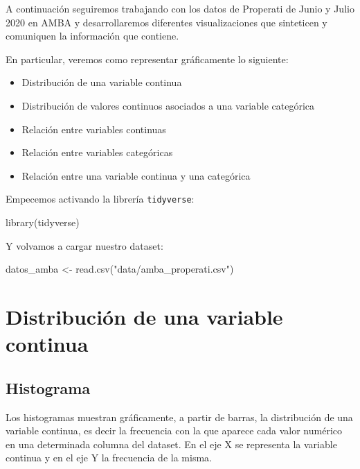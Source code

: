 \documentclass[
  spanish,
]{book}
\newenvironment{Shaded}{\begin{snugshade}}{\end{snugshade}}
\newcommand{\FunctionTok}[1]{\textcolor[rgb]{0.00,0.00,0.00}{#1}}
\newcommand{\NormalTok}[1]{#1}
\newcommand{\OtherTok}[1]{\textcolor[rgb]{0.56,0.35,0.01}{#1}}
\newcommand{\StringTok}[1]{\textcolor[rgb]{0.31,0.60,0.02}{#1}}
\providecommand{\tightlist}{%
  \setlength{\itemsep}{0pt}\setlength{\parskip}{0pt}}
\begin{document}
A continuación seguiremos trabajando con los datos de Properati de Junio y Julio 2020 en AMBA y desarrollaremos diferentes visualizaciones que sinteticen y comuniquen la información que contiene.

En particular, veremos como representar gráficamente lo siguiente:

\begin{itemize}
\tightlist
\item
  Distribución de una variable continua
\item
  Distribución de valores continuos asociados a una variable categórica
\item
  Relación entre variables continuas
\item
  Relación entre variables categóricas
\item
  Relación entre una variable continua y una categórica
\end{itemize}

Empecemos activando la librería \texttt{tidyverse}:

\begin{Shaded}
\begin{Highlighting}[]
\FunctionTok{library}\NormalTok{(tidyverse)}
\end{Highlighting}
\end{Shaded}

Y volvamos a cargar nuestro dataset:

\begin{Shaded}
\begin{Highlighting}[]
\NormalTok{datos\_amba }\OtherTok{\textless{}{-}} \FunctionTok{read.csv}\NormalTok{(}\StringTok{"data/amba\_properati.csv"}\NormalTok{)}
\end{Highlighting}
\end{Shaded}

\hypertarget{distribuciuxf3n-de-una-variable-continua}{%
\section{Distribución de una variable continua}\label{distribuciuxf3n-de-una-variable-continua}}

\hypertarget{histograma}{%
\subsection{Histograma}\label{histograma}}

Los histogramas muestran gráficamente, a partir de barras, la distribución de una variable continua, es decir la frecuencia con la que aparece cada valor numérico en una determinada columna del dataset. En el eje X se representa la variable continua y en el eje Y la frecuencia de la misma.
\end{document}
